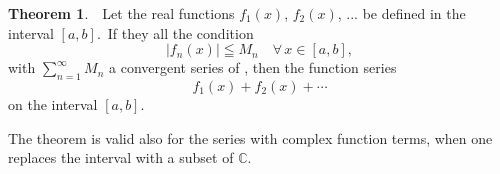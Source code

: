 \documentclass[12pt]{article}
\theoremstyle{definition}
\newtheorem*{thmplain}{Theorem}
\begin{document}
\begin{thmplain}
\, \,Let the real functions $f_1(x)$, $f_2(x)$, ... be defined in the interval $[a, b]$. \,If they all  the condition 
         $$|f_n(x)| \leqq M_n \quad \forall\,x\in[a, b],$$
with $\sum_{n = 1}^{\infty}M_n$ a convergent series of , then the function series 
                      $$f_1(x)\!+\!f_2(x)\!+\!\cdots$$
 on the interval $[a, b]$.
\end{thmplain}

The theorem is valid also for the series with complex function terms, when one replaces the interval with a subset of $\mathbb{C}$.
\end{document}
